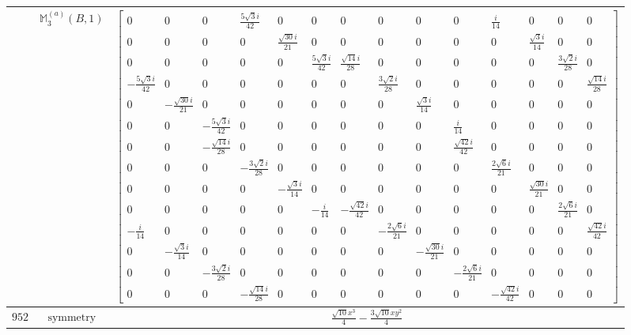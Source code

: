 \documentclass[fleqn,8pt,landscape]{jsarticle}
\begin{document}
\begin{longtable}{ccc}
$  $ & $ \mathbb{M}_{3}^{(a)}(B,1) $ & $ \begin{bmatrix} 0 & 0 & 0 & \frac{5 \sqrt{3} i}{42} & 0 & 0 & 0 & 0 & 0 & 0 & \frac{i}{14} & 0 & 0 & 0 \\ 0 & 0 & 0 & 0 & \frac{\sqrt{30} i}{21} & 0 & 0 & 0 & 0 & 0 & 0 & \frac{\sqrt{3} i}{14} & 0 & 0 \\ 0 & 0 & 0 & 0 & 0 & \frac{5 \sqrt{3} i}{42} & \frac{\sqrt{14} i}{28} & 0 & 0 & 0 & 0 & 0 & \frac{3 \sqrt{2} i}{28} & 0 \\ - \frac{5 \sqrt{3} i}{42} & 0 & 0 & 0 & 0 & 0 & 0 & \frac{3 \sqrt{2} i}{28} & 0 & 0 & 0 & 0 & 0 & \frac{\sqrt{14} i}{28} \\ 0 & - \frac{\sqrt{30} i}{21} & 0 & 0 & 0 & 0 & 0 & 0 & \frac{\sqrt{3} i}{14} & 0 & 0 & 0 & 0 & 0 \\ 0 & 0 & - \frac{5 \sqrt{3} i}{42} & 0 & 0 & 0 & 0 & 0 & 0 & \frac{i}{14} & 0 & 0 & 0 & 0 \\ 0 & 0 & - \frac{\sqrt{14} i}{28} & 0 & 0 & 0 & 0 & 0 & 0 & \frac{\sqrt{42} i}{42} & 0 & 0 & 0 & 0 \\ 0 & 0 & 0 & - \frac{3 \sqrt{2} i}{28} & 0 & 0 & 0 & 0 & 0 & 0 & \frac{2 \sqrt{6} i}{21} & 0 & 0 & 0 \\ 0 & 0 & 0 & 0 & - \frac{\sqrt{3} i}{14} & 0 & 0 & 0 & 0 & 0 & 0 & \frac{\sqrt{30} i}{21} & 0 & 0 \\ 0 & 0 & 0 & 0 & 0 & - \frac{i}{14} & - \frac{\sqrt{42} i}{42} & 0 & 0 & 0 & 0 & 0 & \frac{2 \sqrt{6} i}{21} & 0 \\ - \frac{i}{14} & 0 & 0 & 0 & 0 & 0 & 0 & - \frac{2 \sqrt{6} i}{21} & 0 & 0 & 0 & 0 & 0 & \frac{\sqrt{42} i}{42} \\ 0 & - \frac{\sqrt{3} i}{14} & 0 & 0 & 0 & 0 & 0 & 0 & - \frac{\sqrt{30} i}{21} & 0 & 0 & 0 & 0 & 0 \\ 0 & 0 & - \frac{3 \sqrt{2} i}{28} & 0 & 0 & 0 & 0 & 0 & 0 & - \frac{2 \sqrt{6} i}{21} & 0 & 0 & 0 & 0 \\ 0 & 0 & 0 & - \frac{\sqrt{14} i}{28} & 0 & 0 & 0 & 0 & 0 & 0 & - \frac{\sqrt{42} i}{42} & 0 & 0 & 0 \end{bmatrix} $ \\ \hline
$ 952 $ & $ \text{symmetry} $ & $ \frac{\sqrt{10} x^{3}}{4} - \frac{3 \sqrt{10} x y^{2}}{4} $ \\

\end{longtable}
\end{document}
